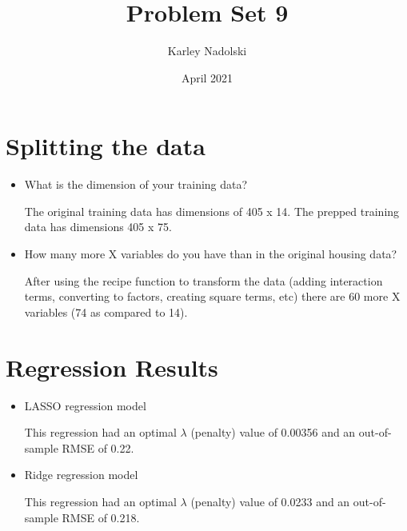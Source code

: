 \documentclass{article}
\title{Problem Set 9}
\author{Karley Nadolski }
\date{April 2021}
\begin{document}
\maketitle

\section{Splitting the data}
\begin{itemize}
    \item What is the dimension of your training data? 
    
    The original training data has dimensions of 405 x 14. The prepped training data has dimensions 405 x 75. 
    
    \item How many more X variables do you have than in the original housing data? 
    
    After using the recipe function to transform the data (adding interaction terms, converting to factors, creating square terms, etc) there are 60 more X variables (74 as compared to 14).
    
\end{itemize}

\section{Regression Results}
\begin{itemize}
    \item LASSO regression model
    
    This regression had an optimal $\lambda$ (penalty) value of 0.00356 and an out-of-sample RMSE of 0.22.
    
    \item Ridge regression model
    
    This regression had an optimal $\lambda$ (penalty) value of 0.0233 and an out-of-sample RMSE of 0.218.
    
\end{itemize}
\end{document}
